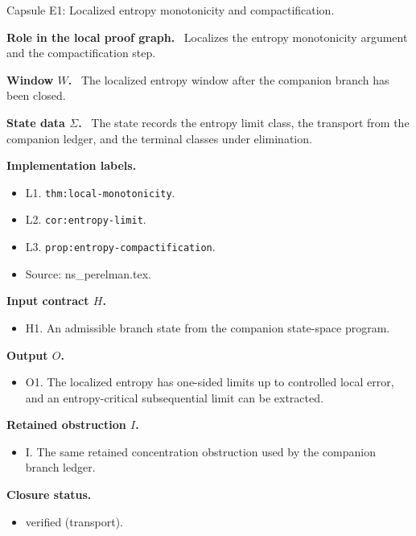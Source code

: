 \documentclass[11pt]{amsart}
\newcommand{\capsulefield}[1]{\par\smallskip\noindent\textbf{#1.}\ }
\begin{document}
\begin{proofcapsule}{Capsule E1: Localized entropy monotonicity and compactification.}
  \capsulefield{Role in the local proof graph}
  Localizes the entropy monotonicity argument and the compactification step.

  \capsulefield{Window \(W\)}
The localized entropy window after the companion branch has been closed.

  \capsulefield{State data \(\Sigma\)}
The state records the entropy limit class, the transport from the companion ledger, and the terminal classes under elimination.

  \capsulefield{Implementation labels}
  \begin{itemize}[leftmargin=1.8em]
  \item L1. \texttt{thm:local-monotonicity}.
  \item L2. \texttt{cor:entropy-limit}.
  \item L3. \texttt{prop:entropy-compactification}.
  \item Source: ns\_perelman.tex.
  \end{itemize}

  \capsulefield{Input contract \(H\)}
  \begin{itemize}[leftmargin=1.8em]
  \item H1. An admissible branch state from the companion state-space program.
  \end{itemize}

  \capsulefield{Output \(O\)}
  \begin{itemize}[leftmargin=1.8em]
  \item O1. The localized entropy has one-sided limits up to controlled local error, and an entropy-critical subsequential limit can be extracted.
  \end{itemize}

  \capsulefield{Retained obstruction \(I\)}
  \begin{itemize}[leftmargin=1.8em]
  \item I. The same retained concentration obstruction used by the companion branch ledger.
  \end{itemize}

  \capsulefield{Closure status}
  \begin{itemize}[leftmargin=1.8em]
  \item verified (transport).
  \end{itemize}
\end{proofcapsule}
\end{document}
